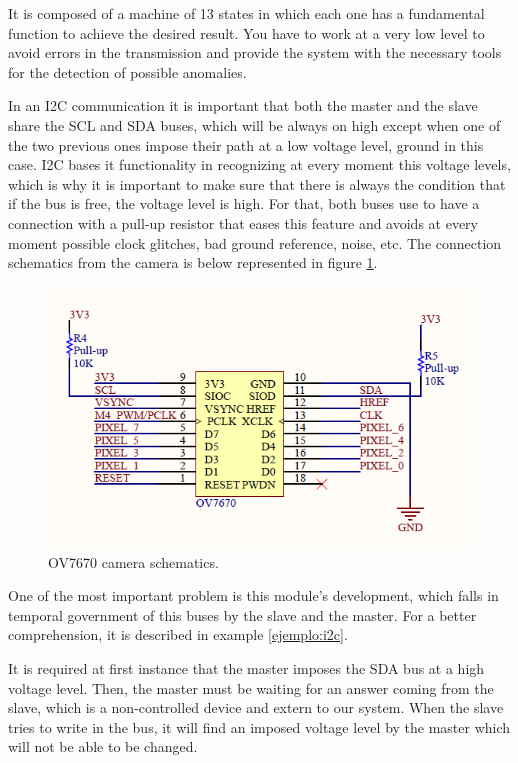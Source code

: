 It is composed of a machine of 13 states in which each one has a fundamental function to achieve the desired result. You have to work at a very low level to avoid errors in the transmission and provide the system with the necessary tools for the detection of possible anomalies.

In an I2C communication it is important that both the master and the slave share the SCL and SDA buses, which will be always on high except when one of the two previous ones impose their path at a low voltage level, ground in this case. I2C bases it functionality in recognizing at every moment this voltage levels, which is why it is important to make sure that there is always the condition that if the bus is free, the voltage level is high. For that, both buses use to have a connection with a pull-up resistor that eases this feature and avoids at every moment possible clock glitches, bad ground reference, noise, etc. The connection schematics from the camera is below represented in figure \ref{fig:OV7670_schematic}.

\begin{figure}[H]
	\center
	\includegraphics[scale=0.7, angle=0]{imagenes/Cuadricoptero_vision/OV7670_schematic}
	\caption{OV7670 camera schematics.}
	\label{fig:OV7670_schematic}
\end{figure}

One of the most important problem is this module’s development, which falls in temporal government of this buses by the slave and the master. For a better comprehension, it is described in example \ref{ejemplo:i2c}.

\begin{ejemplo}\label{ejemplo:i2c}
It is required at first instance that the master imposes the SDA bus at a high voltage level. Then, the master must be waiting for an answer coming from the slave, which is a non-controlled device and extern to our system. When the slave tries to write in the bus, it will find an imposed voltage level by the master which will not be able to be changed.
\end{ejemplo}

